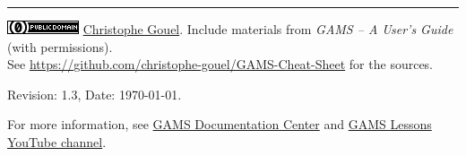\documentclass[10pt,landscape,a4paper]{article}
\begin{document}
\begin{multicols}{2}
\vspace{0.5cm}
\rule{3cm}{0.5pt}

\href{http://creativecommons.org/publicdomain/zero/1.0/}{\includegraphics[height=1.75ex]{CC0-small.png}}
\href{http://www.christophegouel.com}{Christophe Gouel}. Include materials from \emph{GAMS -- A User's Guide} (with permissions). \\
See \url{https://github.com/christophe-gouel/GAMS-Cheat-Sheet} for the sources.

Revision: 1.3, Date: \today{}.

For more information, see \href{http://www.gams.com/help/index.jsp}{GAMS
  Documentation Center} and \href{https://www.youtube.com/user/GAMSLessons}{GAMS
  Lessons YouTube channel}.

\end{multicols}
\end{document}
